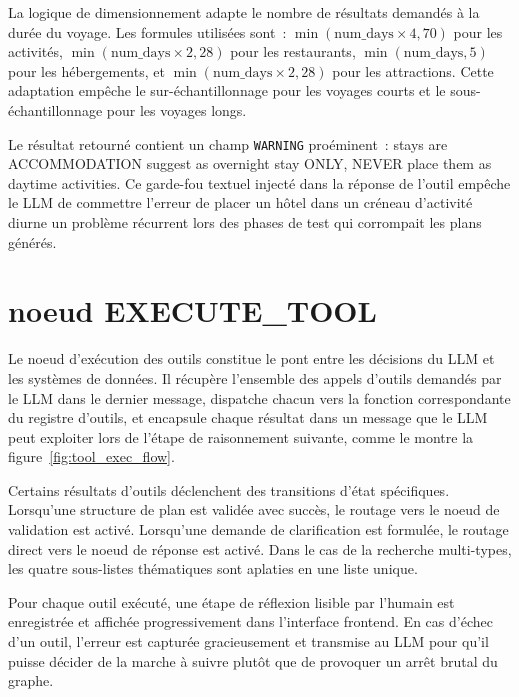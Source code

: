 La logique de dimensionnement adapte le nombre de résultats demandés à la durée du voyage.
Les formules utilisées sont~: $\min(\text{num\_days} \times 4, 70)$ pour les activités,
$\min(\text{num\_days} \times 2, 28)$ pour les restaurants, $\min(\text{num\_days}, 5)$ pour
les hébergements, et $\min(\text{num\_days} \times 2, 28)$ pour les attractions. Cette
adaptation empêche le sur-échantillonnage pour les voyages courts et le sous-échantillonnage
pour les voyages longs.

Le résultat retourné contient un champ \texttt{WARNING} proéminent~: \og{}stays are
ACCOMMODATION   suggest as overnight stay ONLY, NEVER place them as daytime activities\fg{}.
Ce garde-fou textuel injecté dans la réponse de l'outil empêche le LLM de commettre l'erreur
de placer un hôtel dans un créneau d'activité diurne   un problème récurrent lors des phases
de test qui corrompait les plans générés.



\section{noeud EXECUTE\_TOOL}

Le noeud d'exécution des outils constitue le pont entre les décisions du LLM et les systèmes
de données. Il récupère l'ensemble des appels d'outils demandés par le LLM dans le dernier
message, dispatche chacun vers la fonction correspondante du registre d'outils, et encapsule
chaque résultat dans un message que le LLM peut exploiter lors de l'étape de raisonnement
suivante, comme le montre la figure~\ref{fig:tool_exec_flow}.

Certains résultats d'outils déclenchent des transitions d'état spécifiques. Lorsqu'une
structure de plan est validée avec succès, le routage vers le noeud de validation est activé.
Lorsqu'une demande de clarification est formulée, le routage direct vers le noeud de réponse
est activé. Dans le cas de la recherche
multi-types, les quatre sous-listes thématiques sont aplaties en une liste unique.

Pour chaque outil exécuté, une étape de réflexion lisible par l'humain est enregistrée et
affichée progressivement dans l'interface frontend. En cas d'échec d'un outil, l'erreur est
capturée gracieusement et transmise au LLM pour qu'il puisse décider de la marche à suivre
plutôt que de provoquer un arrêt brutal du graphe.

